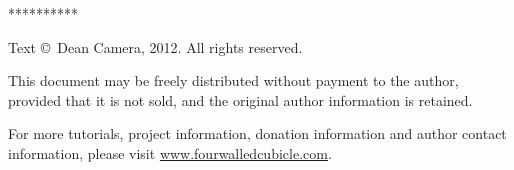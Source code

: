 \vspace*{\fill}
\centerline{**********}

Text \copyright \ Dean Camera, 2012. All rights reserved.

This document may be freely distributed without payment to the author, provided that it is not sold, and the original author information is retained.

For more tutorials, project information, donation information and author contact information, please visit \href{http://www.fourwalledcubicle.com}{www.fourwalledcubicle.com}.

\cleardoublepage
